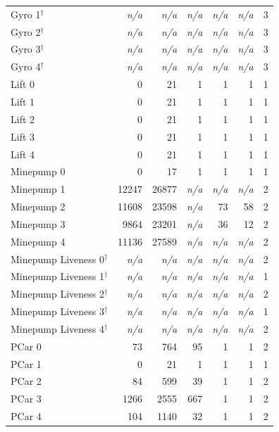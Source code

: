 \begin{table}[h]
\begin{tabular}{l|rr|rrr|c}
Gyro 1$^\dagger$ & \textit{n/a} & \textit{n/a} & \textit{n/a} & \textit{n/a} & \textit{n/a} & 3 \\
Gyro 2$^\dagger$ & \textit{n/a} & \textit{n/a} & \textit{n/a} & \textit{n/a} & \textit{n/a} & 3 \\
Gyro 3$^\dagger$ & \textit{n/a} & \textit{n/a} & \textit{n/a} & \textit{n/a} & \textit{n/a} & 3 \\
Gyro 4$^\dagger$ & \textit{n/a} & \textit{n/a} & \textit{n/a} & \textit{n/a} & \textit{n/a} & 3 \\
\midrule
Lift 0 & 0 & 21 & 1 & 1 & 1 & 1 \\
Lift 1 & 0 & 21 & 1 & 1 & 1 & 1 \\
Lift 2 & 0 & 21 & 1 & 1 & 1 & 1 \\
Lift 3 & 0 & 21 & 1 & 1 & 1 & 1 \\
Lift 4 & 0 & 21 & 1 & 1 & 1 & 1 \\
\midrule
Minepump 0 & 0 & 17 & 1 & 1 & 1 & 1 \\
Minepump 1 & 12247 & 26877 & \textit{n/a} & \textit{n/a} & \textit{n/a} & 2 \\
Minepump 2 & 11608 & 23598 & \textit{n/a} & 73 & 58 & 2 \\
Minepump 3 & 9864 & 23201 & \textit{n/a} & 36 & 12 & 2 \\
Minepump 4 & 11136 & 27589 & \textit{n/a} & \textit{n/a} & \textit{n/a} & 2 \\
\midrule
Minepump Liveness 0$^\dagger$ & \textit{n/a} & \textit{n/a} & \textit{n/a} & \textit{n/a} & \textit{n/a} & 2 \\
Minepump Liveness 1$^\dagger$ & \textit{n/a} & \textit{n/a} & \textit{n/a} & \textit{n/a} & \textit{n/a} & 1 \\
Minepump Liveness 2$^\dagger$ & \textit{n/a} & \textit{n/a} & \textit{n/a} & \textit{n/a} & \textit{n/a} & 2 \\
Minepump Liveness 3$^\dagger$ & \textit{n/a} & \textit{n/a} & \textit{n/a} & \textit{n/a} & \textit{n/a} & 1 \\
Minepump Liveness 4$^\dagger$ & \textit{n/a} & \textit{n/a} & \textit{n/a} & \textit{n/a} & \textit{n/a} & 2 \\
\midrule
PCar 0 & 73 & 764 & 95 & 1 & 1 & 2 \\
PCar 1 & 0 & 21 & 1 & 1 & 1 & 1 \\
PCar 2 & 84 & 599 & 39 & 1 & 1 & 2 \\
PCar 3 & 1266 & 2555 & 667 & 1 & 1 & 2 \\
PCar 4 & 104 & 1140 & 32 & 1 & 1 & 2 \\

\end{tabular}
\end{table}
